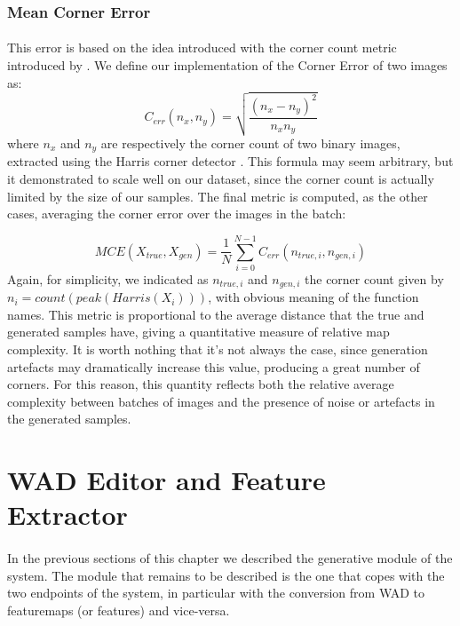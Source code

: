 \subsubsection{Mean Corner Error}
\label{sec:cornererror}
\paragraph{} This error is based on the idea introduced with the corner count metric introduced by \cite{slam}. We define our implementation of the Corner Error of two images as:
\begin{equation}
C_{err}(n_{x}, n_{y}) = \sqrt{\frac{(n_{x} - n_{y})^2}{n_{x}n_{y}}}
\end{equation}
where $n_{x}$ and $n_{y}$ are respectively the corner count of two binary images, extracted using the Harris corner detector \cite{harrisdetector}.
This formula may seem arbitrary, but it demonstrated to scale well on our dataset, since the corner count is actually limited by the size of our samples. The final metric is computed, as the other cases, averaging the corner error over the images in the batch:

\begin{equation}
MCE(X_{true}, X_{gen}) = \frac{1}{N} \sum_{i=0}^{N-1} C_{err}(n_{true,i}, n_{gen,i})
\end{equation}
Again, for simplicity, we indicated as $ n_{true,i} $ and $ n_{gen,i} $ the corner count given by \\ $ n_{i} = count(peak(Harris(X_{i}))) $, with obvious meaning of the function names.
This metric is proportional to the average distance that the true and generated samples have, giving a quantitative measure of relative map complexity. It is worth nothing that it's not always the case, since generation artefacts may dramatically increase this value, producing a great number of corners. For this reason, this quantity reflects both the relative average complexity between batches of images and the presence of noise or artefacts in the generated samples.

\section{WAD Editor and Feature Extractor}
\label{sec:editor}
\paragraph{} In the previous sections of this chapter we described the generative module of the system. The module that remains to be described is the one that copes with the two endpoints of the system, in particular with the conversion from WAD to \glspl{featuremap} (or features) and vice-versa. 
